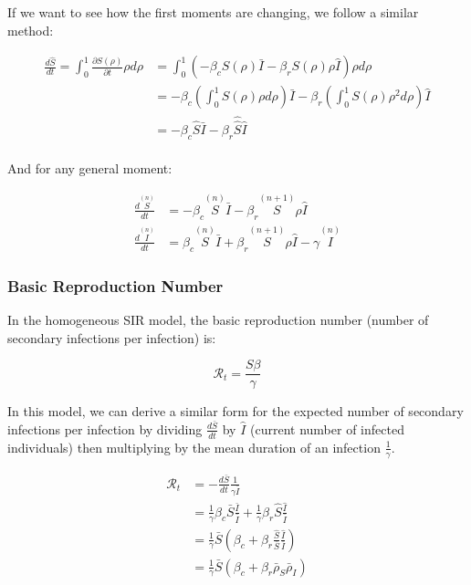 \documentclass{article}
\begin{document}
If we want to see how the first moments are changing, we follow a similar method:

\begin{align*}
\frac{d \hat{S}}{dt} = \int_{0}^{1} \frac{\partial S(\rho)}{\partial t} \rho d\rho
&= \int_{0}^{1} (-\beta_c S(\rho) \bar I - \beta_r S(\rho) \rho \hat I) \rho d\rho  \\
&= -\beta_c (\int_{0}^{1} S(\rho) \rho d\rho) \bar I
	- \beta_r (\int_{0}^{1} S(\rho) \rho^2 d\rho) \hat I\\
&= -\beta_c \hat S \bar I - \beta_r \hat{\hat{ S}} \hat I
\end{align*}\\

And for any general moment:


\begin{equation}
\label{eqn:moments}
\begin{aligned}
\frac{d \overset{(n)}{S} }{dt} &=
	-\beta_c \overset{(n)}{S} \bar I
	-\beta_r \overset{(n+1)}{S} \rho \hat I \\
\frac{d \overset{(n)}{I}}{dt} &=
	\beta_c \overset{(n)}{S} \bar I
	+ \beta_r \overset{(n+1)}{S} \rho \hat I - \gamma \overset{(n)}{I}
\end{aligned}
\end{equation}


\subsubsection{Basic Reproduction Number}

In the homogeneous SIR model, the basic reproduction number (number of secondary
infections per infection) is:

$$\mathcal{R}_t = \frac{S\beta}{\gamma}$$

In this model, we can derive a similar form for the expected
number of secondary infections per infection by dividing $\frac{d \bar S}{dt}$
by $\hat I$ (current number of infected individuals) then multiplying by
the mean duration of an infection $\frac{1}{\gamma}$.

\begin{align*}
\mathcal{R}_t &= -\frac{d\bar S}{dt} \frac{1}{\gamma \bar I} \\
	&= \frac{1}{\gamma} \beta_c \bar S \frac{\bar I}{\bar I}
		+ \frac{1}{\gamma} \beta_r \hat S \frac{\hat I}{\bar I}\\
	&= \frac{1}{\gamma} \bar S\left( \beta_c
		+ \beta_r \frac{\hat S}{\bar S} \frac{\hat I}{\bar I} \right)\\
	&= \frac{1}{\gamma} \bar S\left( \beta_c
		+ \beta_r \bar \rho_S \bar \rho_I \right)\\
\end{align*}
\end{document}
